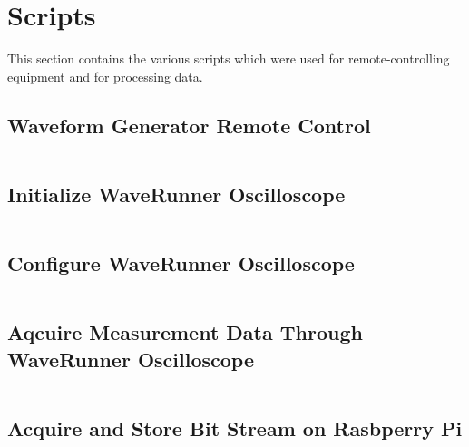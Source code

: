 \chapter{Scripts}
\label{app:chap:scripts}

This   section   contains   the   various  scripts   which   were   used   for
remote-controlling equipment and for processing data.

\section{Waveform Generator Remote Control}
\label{sec:app:33120A}
\inputminted{python}{code/33120A.py}

\section{Initialize WaveRunner Oscilloscope}
\label{sec:app:waveRunner:initialize}
\inputminted{python}{code/initWaveRunner.py}

\section{Configure WaveRunner Oscilloscope}
\label{sec:app:waveRunner:config}
\inputminted{python}{code/configWaveRunner.py}

\section{Aqcuire Measurement Data Through WaveRunner Oscilloscope}
\label{sec:app:waveRunner:acquire}
\inputminted{python}{code/acquireWaveRunnerData.py}

\section{Acquire and Store Bit Stream on Rasbperry Pi}
\label{sec:app:raspi:aquire}
\inputminted{cpp}{code/main.cpp}

